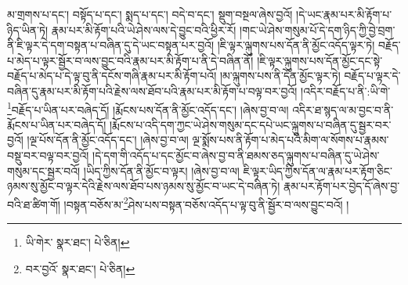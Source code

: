 མ་གྲགས་པ་དང་། བསྟོད་པ་དང་། སྨད་པ་དང་། བདེ་བ་དང་། སྡུག་བསྔལ་ཞེས་བྱའོ། །དེ་ཡང་རྣམ་པར་མི་རྟོག་པ་ཉིད་ཡིན་ཏེ། རྣམ་པར་མི་རྟོག་པའི་ཡེ་ཤེས་ལས་དེ་བྱུང་བའི་ཕྱིར་རོ། །གང་ཡེ་ཤེས་གསུམ་པོ་དེ་དག་ཉིད་ཀྱི་བྱེ་བྲག་ནི་ཇི་ལྟར་དེ་དག་བསྟན་པ་བཞིན་དུ་དེ་ཡང་བསྟན་པར་བྱའོ། །ཇི་ལྟར་ལྐུགས་པས་དོན་ནི་མྱོང་འདོད་ལྟར་ཏེ། བརྗོད་པ་མེད་པ་ལྟར་སྦྱོར་བ་ལས་བྱུང་བའི་རྣམ་པར་མི་རྟོག་པ་ནི་དེ་བཞིན་ནོ། །ཇི་ལྟར་ལྐུགས་པས་དོན་མྱོང་དང་སྟེ་བརྗོད་པ་མེད་པ་དེ་ལྟ་བུ་ནི་དངོས་གཞི་རྣམ་པར་མི་རྟོག་པའོ། །མ་ལྐུགས་པས་ནི་དོན་མྱོང་ལྟར་ཏེ། བརྗོད་པ་ལྟར་དེ་བཞིན་དུ་རྣམ་པར་མི་རྟོག་པའི་རྗེས་ལས་ཐོབ་པའི་རྣམ་པར་མི་རྟོག་པ་བལྟ་བར་བྱའོ། །འདིར་བརྗོད་པ་ནི་:ཡི་གེ་\footnote{ཡི་གེར་  སྣར་ཐང་།  པེ་ཅིན། }བརྗོད་པ་ཡིན་པར་བཞེད་དོ། །རྨོངས་པས་དོན་ནི་མྱོང་འདོད་དང་། །ཞེས་བྱ་བ་ལ། འདིར་ཐ་སྙད་ལ་མ་བྱང་བ་ནི་རྨོངས་པ་ཡིན་པར་བཞེད་དོ། །རྨོངས་པ་འདི་དག་ཀྱང་ཡེ་ཤེས་གསུམ་དང་དཔེ་ཡང་ལྐུགས་པ་བཞིན་དུ་སྦྱར་བར་བྱའོ། །ལྔ་པོས་དོན་ནི་མྱོང་འདོད་དང་། །ཞེས་བྱ་བ་ལ། ལྔ་སྨོས་པས་ནི་རྟོག་པ་མེད་པའི་མིག་ལ་སོགས་པ་རྣམས་བསྡུ་བར་བལྟ་བར་བྱའོ། །དེ་དག་གི་འདོད་པ་དང་མྱོང་བ་ཞེས་བྱ་བ་ནི་ཐམས་ཅད་ལྐུགས་པ་བཞིན་དུ་ཡེ་ཤེས་གསུམ་དང་སྦྱར་བའོ། །ཡིད་ཀྱིས་དོན་ནི་མྱོང་བ་ལྟར། །ཞེས་བྱ་བ་ལ། ཇི་ལྟར་ཡིད་ཀྱིས་དོན་ལ་རྣམ་པར་རྟོག་ཅིང་ཉམས་སུ་མྱོང་བ་ལྟར་དེའི་རྗེས་ལས་ཐོབ་པས་ཉམས་སུ་མྱོང་བ་ཡང་དེ་བཞིན་ཏེ། རྣམ་པར་རྟོག་པར་བྱེད་དོ་ཞེས་བྱ་བའི་ཐ་ཚིག་གོ། །བསྟན་བཅོས་མ་\footnote{བར་བྱའོ་  སྣར་ཐང་།  པེ་ཅིན། }ཤེས་པས་བསྟན་བཅོས་འདོད་པ་ལྟ་བུ་ནི་སྦྱོར་བ་ལས་བྱུང་བའོ། །
